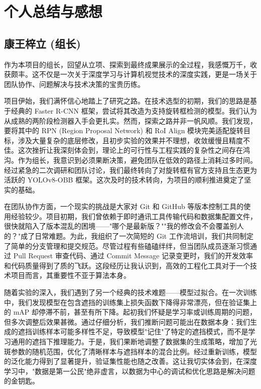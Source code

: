 \documentclass[12pt, a4paper]{report}
\begin{document}
\chapter{个人总结与感想}

\section{康王梓立 (组长)}
作为本项目的组长，回望从立项、探索到最终成果展示的全过程，我感慨万千，收获颇丰。这不仅是一次关于深度学习与计算机视觉技术的深度实践，更是一场关于团队协作、问题解决与技术决策的宝贵历练。

项目伊始，我们满怀信心地踏上了研究之路。在技术选型的初期，我们的思路是基于经典的 Faster R-CNN 框架，尝试将其改造为支持旋转框检测的模型。我们认为从成熟的两阶段检测器入手会更扎实。然而，探索之路并非一帆风顺。我们发现，要将其中的 RPN (Region Proposal Network) 和 RoI Align 模块完美适配旋转目标，涉及大量复杂的底层修改，且初步实验的效果并不理想，收敛缓慢且精度不佳。这次挫折让我深刻体会到，理论上的可行性与工程实践的复杂性之间存在鸿沟。作为组长，我意识到必须果断决策，避免团队在低效的路径上消耗过多时间。经过紧急的二次调研和团队讨论，我们最终转向了对旋转框有官方支持且生态更为活跃的 YOLOv8-OBB 框架。这次及时的技术转向，为项目的顺利推进奠定了坚实的基础。

在团队协作方面，一个现实的挑战是大家对 Git 和 GitHub 等版本控制工具的使用经验较少。项目初期，我们曾依赖于即时通讯工具传输代码和数据集配置文件，很快就陷入了版本混乱的困境——"哪个是最新版？""我的修改会不会覆盖别人的？"成了日常难题。为此，我组织了一次简短的 Git 工作流培训，我们共同制定了简单的分支管理和提交规范。尽管过程有些磕磕绊绊，但当团队成员逐渐习惯通过 Pull Request 审查代码、通过 Commit Message 记录变更时，我们的开发效率和代码质量得到了质的飞跃。这段经历让我认识到，高效的工程化工具对于一个技术项目而言，其重要性不亚于算法本身。

随着实验的深入，我们遇到了另一个经典的技术难题——模型过拟合。在一次训练中，我们发现模型在包含遮挡的训练集上损失函数下降得非常漂亮，但在验证集上的 mAP 却停滞不前，甚至有所下降。起初我们怀疑是学习率或训练周期的问题，但多次调整后效果甚微。通过仔细分析，我们推断问题可能出在数据本身：我们生成的遮挡训练样本可能多样性不足，导致模型"记住"了特定的遮挡模式，而不是学习通用的遮挡下推理能力。于是，我们果断地调整了数据集的生成策略，增加了光斑参数的随机范围，优化了清晰样本与遮挡样本的混合比例。经过重新训练，模型的泛化能力得到了显著提升，验证集性能也随之改善。这让我切实体会到，在深度学习中，"数据是第一公民"绝非虚言，以数据为中心的调试和优化思路是解决问题的金钥匙。
\end{document}
